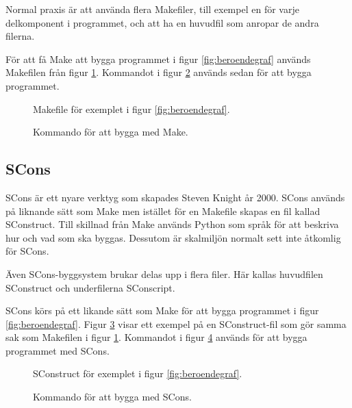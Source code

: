 Normal praxis är att använda flera Makefiler, till exempel en för varje delkomponent i programmet, och att ha en huvudfil som anropar de andra filerna.

För att få Make att bygga programmet i figur \ref{fig:beroendegraf} används Makefilen från figur \ref{fig:makefile}. Kommandot i figur \ref{fig:makekommando} används sedan för att bygga programmet.

\begin{figure}[h!]
  
  \caption{Makefile för exemplet i figur \ref{fig:beroendegraf}.}
  \label{fig:makefile}
\end{figure}

\begin{figure}[h!]
  
  \caption{Kommando för att bygga med Make.}
  \label{fig:makekommando}
\end{figure}

\subsection{SCons}
SCons är ett nyare verktyg som skapades Steven Knight år 2000. SCons används på liknande sätt som Make men istället för en Makefile skapas en fil kallad SConstruct. Till skillnad från Make används Python som språk för att beskriva hur och vad som ska byggas. Dessutom är skalmiljön normalt sett inte åtkomlig för SCons.

Även SCons-byggsystem brukar delas upp i flera filer. Här kallas huvudfilen SConstruct och underfilerna SConscript.

SCons körs på ett likande sätt som Make för att bygga programmet i figur \ref{fig:beroendegraf}. Figur \ref{fig:sconstruct} visar ett exempel på en SConstruct-fil som gör samma sak som Makefilen i figur \ref{fig:makefile}. Kommandot i figur \ref{fig:sconskommando} används för att bygga programmet med SCons.

\begin{figure}[h!]
  
  \caption{SConstruct för exemplet i figur \ref{fig:beroendegraf}.}
  \label{fig:sconstruct}
\end{figure}

\begin{figure}[h!]
  
  \caption{Kommando för att bygga med SCons.}
  \label{fig:sconskommando}
\end{figure}
